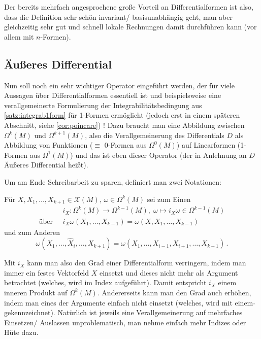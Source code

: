 \documentclass[../H_Analysis_main.tex]{subfiles}
\begin{document}
Der bereits mehrfach angesprochene große Vorteil an Differentialformen ist also, dass die Definition sehr schön invariant/ basisunabhängig geht, man aber gleichzeitig sehr gut und schnell lokale Rechnungen damit durchführen kann (vor allem mit $n$-Formen).




		\subsection{Äußeres Differential}
Nun soll noch ein sehr wichtiger Operator eingeführt werden, der für viele Aussagen über Differentialformen essentiell ist und beispielsweise eine verallgemeinerte Formulierung der Integrabilitätsbedingung aus \ref{satz:integrab1form} für 1-Formen ermöglicht (jedoch erst in einem späteren Abschnitt, siehe \ref{cor:poincare}) ! Dazu braucht man eine Abbildung zwischen $\Omega^k(M)$ und $\Omega^{k + 1}(M)$, also die Verallgemeinerung des Differentials $D$ als Abbildung von Funktionen ($\equiv$ 0-Formen aus $\Omega^0(M)$) auf Linearformen (1-Formen aus $\Omega^1(M)$) und das ist eben dieser Operator (der in Anlehnung an $D$ Äußeres Differential heißt).


Um am Ende Schreibarbeit zu sparen, definiert man zwei Notationen:
\begin{defi}[Hilfsnotationen]
Für $X, X_1, \dots, X_{k + 1} \in \mathcal{X}(M), \, \omega \in \Omega^k(M)$ sei zum Einen
\begin{equation}
\begin{split}
&i_X: \Omega^k(M) \rightarrow \Omega^{k - 1}(M), \; \omega \mapsto i_X \omega \in \Omega^{k - 1}(M) 
\\
\text{über } \; &i_X\omega(X_1, \dots, X_{k - 1}) = \omega(X, X_1, \dots, X_{k - 1})
\end{split}
\end{equation}
und zum Anderen
\begin{equation}
\omega(X_1, \dots, \hat{X}_i, \dots, X_{k + 1}) = \omega(X_1, \dots, X_{i - 1}, X_{i + 1}, \dots, X_{k + 1}) \, .
\end{equation}
\end{defi}

Mit $i_X$ kann man also den Grad einer Differentialform verringern, indem man immer ein festes Vektorfeld $X$ einsetzt und dieses nicht mehr als Argument betrachtet (welches, wird im Index aufgeführt). Damit entspricht $i_X$ einem inneren Produkt auf $\Omega^k(M)$. Andererseits kann man den Grad auch erhöhen, indem man eines der Argumente einfach nicht einsetzt (welches, wird mit einem $\hat{ }$ gekennzeichnet). Natürlich ist jeweils eine Verallgemeinerung auf mehrfaches Einsetzen/ Auslassen unproblematisch, man nehme einfach mehr Indizes oder Hüte dazu.
\end{document}
